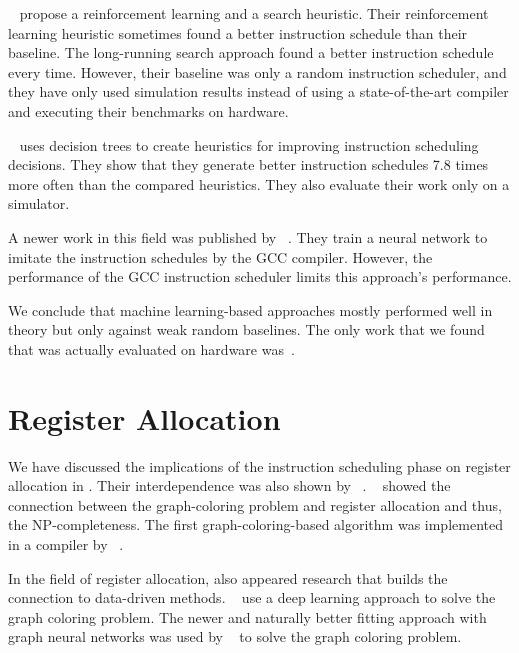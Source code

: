 \citeauthor{mcgovern1999scheduling}~\cite{mcgovern1999scheduling,mcgovern2002building} propose a reinforcement learning and a search heuristic.
Their reinforcement learning heuristic sometimes found a better instruction schedule than their baseline.
The long-running search approach found a better instruction schedule every time.
However, their baseline was only a random instruction scheduler, and they have only used simulation results instead of using a state-of-the-art compiler and executing their benchmarks on hardware.

\citeauthor{russell2006learning}~\cite{russell2006learning} uses decision trees to create heuristics for improving instruction scheduling decisions.
They show that they generate better instruction schedules 7.8 times more often than the compared heuristics.
They also evaluate their work only on a simulator.

A newer work in this field was published by \citeauthor{jain2019learning}~\cite{jain2019learning}.
They train a neural network to imitate the instruction schedules by the GCC compiler.
However, the performance of the GCC instruction scheduler limits this approach’s performance.

We conclude that machine learning-based approaches mostly performed well in theory but only against weak random baselines.
The only work that we found that was actually evaluated on hardware was~\cite{beaty1996using}.

\section{Register Allocation}
\label{sec:rw:register-allocation}
We have discussed the implications of the instruction scheduling phase on register allocation in .
Their interdependence was also shown by \citeauthor{goodman1988code}~\cite{goodman1988code}.
\citeauthor{lavrov1962store}~\cite{lavrov1962store} showed the connection between the graph-coloring problem and register allocation and thus, the NP-completeness.
The first graph-coloring-based algorithm was implemented in a compiler by \citeauthor{chaitin1982register}~\cite{chaitin1982register}.

In the field of register allocation, also appeared research that builds the connection to data-driven methods.
\citeauthor{das2019deep}~\cite{das2019deep} use a deep learning approach to solve the graph coloring problem.
The newer and naturally better fitting approach with graph neural networks was used by \citeauthor{lemos2019graph}~\cite{lemos2019graph} to solve the graph coloring problem. 

